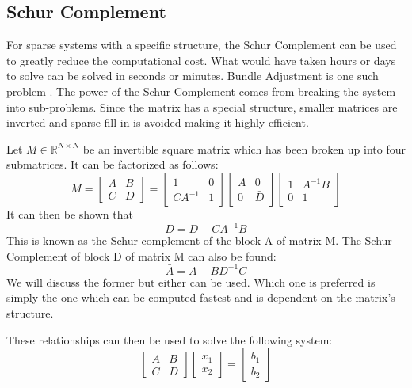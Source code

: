 \documentclass[peerreview,compsoc,onecolumn]{IEEEtran}
\newcommand{\R}{\mathbb{R}}
\begin{document}
\subsection{Schur Complement}
For sparse systems with a specific structure, the Schur Complement can be used to greatly reduce the computational cost. What would have taken hours or days to solve can be solved in seconds or minutes. Bundle Adjustment is one such problem \cite{triggs1999bundle}. The power of the Schur Complement comes from breaking the system into sub-problems. Since the matrix has a special structure, smaller matrices are inverted and sparse fill in \cite{davis2006} is avoided making it highly efficient.

Let $M \in \R^{N \times N}$ be an invertible square matrix which has been broken up into four submatrices. It can be factorized as follows:
\begin{equation}
M = \begin{bmatrix}
A & B \\
C & D
\end{bmatrix}
=
\begin{bmatrix}
1 & 0 \\
C A^{-1} & 1
\end{bmatrix}
\begin{bmatrix}
A & 0 \\
0 & \bar{D}
\end{bmatrix}
\begin{bmatrix}
1 & A^{-1}B \\
0 & 1
\end{bmatrix}
\end{equation}
It can then be shown that
\begin{equation}
\bar{D} = D - C A^{-1}B
\end{equation}
This is known as the Schur complement of the block A of matrix M. The Schur Complement of block D of matrix M can also be found:
\begin{equation}
\bar{A} = A - B D^{-1}C
\end{equation}
We will discuss the former but either can be used. Which one is preferred is simply the one which can be computed fastest and is dependent on the matrix's structure.

These relationships can then be used to solve the following system:
\begin{equation}
\begin{bmatrix}
A & B \\
C & D
\end{bmatrix}
\begin{bmatrix}
x_1 \\ x_2
\end{bmatrix}
=
\begin{bmatrix}
b_1 \\ b_2
\end{bmatrix}
\end{equation}
\end{document}
